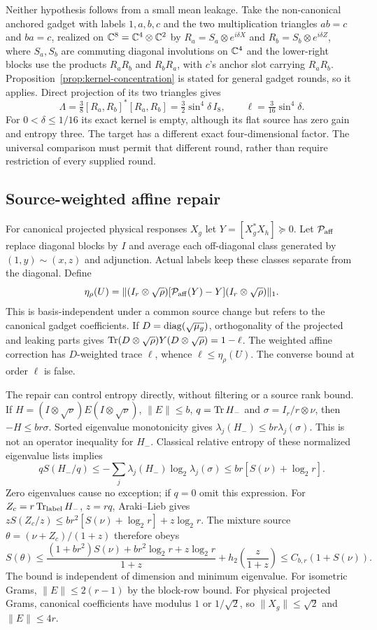 Neither hypothesis follows from a small mean leakage. Take the
non-canonical anchored gadget with labels $1,a,b,c$ and the two
multiplication triangles $ab=c$ and $ba=c$, realized on
$\mathbb C^8=\mathbb C^4\otimes\mathbb C^2$ by $R_a=S_a\otimes e^{i\delta X}$ and
$R_b=S_b\otimes e^{i\delta Z}$, where $S_a,S_b$ are commuting diagonal
involutions on $\mathbb C^4$ and the lower-right blocks use the products
$R_aR_b$ and $R_bR_a$, with $c$'s anchor slot carrying $R_aR_b$. Proposition~\ref{prop:kernel-concentration} is
stated for general gadget rounds, so it applies. Direct projection of
its two triangles gives
\[
 \Lambda=\tfrac38[R_a,R_b]^*[R_a,R_b]
 =\tfrac32\sin^4\delta\,I_8,\qquad
 \ell=\tfrac3{16}\sin^4\delta.
\]
For $0<\delta\leq1/16$ its exact kernel is empty, although its flat
source has zero gain and entropy three. The target has a different
exact four-dimensional factor. The universal comparison must permit
that different round, rather than require restriction of every
supplied round.

\subsection{Source-weighted affine repair}
For canonical projected physical responses $X_g$ let
$Y=[X_g^*X_h]\succeq0$. Let $\mathcal P_{\rm aff}$ replace diagonal
blocks by $I$ and average each off-diagonal class generated by
$(1,y)\sim(x,z)$ and adjunction. Actual labels keep these classes
separate from the diagonal. Define
\[
 \eta_\rho(U)=\|(I_r\otimes\sqrt\rho)
 [\mathcal P_{\rm aff}(Y)-Y](I_r\otimes\sqrt\rho)\|_1.
\]
This is basis-independent under a common source change but refers to
the canonical gadget coefficients. If $D=\operatorname{diag}(\sqrt{\mu_g})$,
orthogonality of the projected and leaking parts gives
$\operatorname{Tr}(D\otimes\sqrt\rho)Y(D\otimes\sqrt\rho)=1-\ell$.
The weighted affine correction has $D$-weighted trace $\ell$, whence
$\ell\leq\eta_\rho(U)$. The converse bound at order $\ell$ is false.

The repair can control entropy directly, without filtering or a source
rank bound. If $H=(I\otimes\sqrt\nu)E(I\otimes\sqrt\nu)$,
$\|E\|\leq b$, $q=\operatorname{Tr} H_-$ and $\sigma=I_r/r\otimes\nu$, then
$-H\leq br\sigma$. Sorted eigenvalue monotonicity gives
$\lambda_j(H_-)\leq br\lambda_j(\sigma)$.
This is not an operator inequality for $H_-$. Classical relative
entropy of these normalized eigenvalue lists implies
\[
 qS(H_-/q)\leq-\sum_j\lambda_j(H_-)\log_2\lambda_j(\sigma)
 \leq br[S(\nu)+\log_2r].
\]
Zero eigenvalues cause no exception; if $q=0$ omit this expression.
For $Z_c=r\operatorname{Tr}_{\rm label}H_-$, $z=rq$, Araki--Lieb gives
$zS(Z_c/z)\leq br^2[S(\nu)+\log_2r]+z\log_2r$.
The mixture source $\theta=(\nu+Z_c)/(1+z)$ therefore obeys
\begin{equation}\label{eq:entropy-stable-source}
 S(\theta)\leq
 \frac{(1+br^2)S(\nu)+br^2\log_2r+z\log_2r}{1+z}
 +h_2\!\left(\frac z{1+z}\right)
 \leq C_{b,r}(1+S(\nu)).
\end{equation}
The bound is independent of dimension and minimum eigenvalue.
For isometric Grams, $\|E\|\leq2(r-1)$ by the block-row bound.
For physical projected Grams, canonical coefficients have modulus
$1$ or $1/\sqrt2$, so $\|X_g\|\leq\sqrt2$ and $\|E\|\leq4r$.

